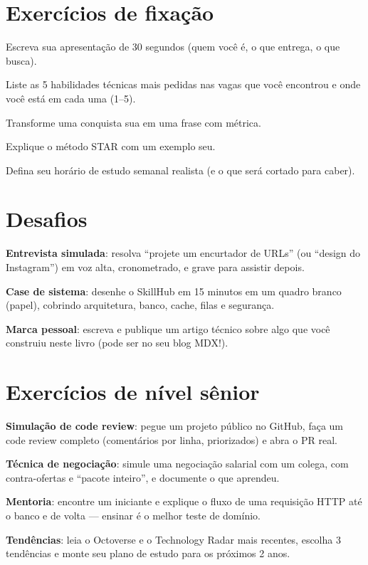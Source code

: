 \section{Exercícios de fixação}

\begin{exercicios}
  \item Escreva sua apresentação de 30 segundos (quem você é, o que entrega, o que busca).
  \item Liste as 5 habilidades técnicas mais pedidas nas vagas que você encontrou e onde você está em cada uma (1--5).
  \item Transforme uma conquista sua em uma frase com métrica.
  \item Explique o método STAR com um exemplo seu.
  \item Defina seu horário de estudo semanal realista (e o que será cortado para caber).
\end{exercicios}

\section{Desafios}

\begin{desafios}
  \item \textbf{Entrevista simulada}: resolva ``projete um encurtador de URLs'' (ou ``design do Instagram'') em voz alta, cronometrado, e grave para assistir depois.
  \item \textbf{Case de sistema}: desenhe o SkillHub em 15 minutos em um quadro branco (papel), cobrindo arquitetura, banco, cache, filas e segurança.
  \item \textbf{Marca pessoal}: escreva e publique um artigo técnico sobre algo que você construiu neste livro (pode ser no seu blog MDX!).
\end{desafios}

\section{Exercícios de nível sênior}

\begin{seniores}
  \item \textbf{Simulação de code review}: pegue um projeto público no GitHub, faça um code review completo (comentários por linha, priorizados) e abra o PR real.
  \item \textbf{Técnica de negociação}: simule uma negociação salarial com um colega, com contra-ofertas e ``pacote inteiro'', e documente o que aprendeu.
  \item \textbf{Mentoria}: encontre um iniciante e explique o fluxo de uma requisição HTTP até o banco e de volta — ensinar é o melhor teste de domínio.
  \item \textbf{Tendências}: leia o Octoverse e o Technology Radar mais recentes, escolha 3 tendências e monte seu plano de estudo para os próximos 2 anos.
\end{seniores}

